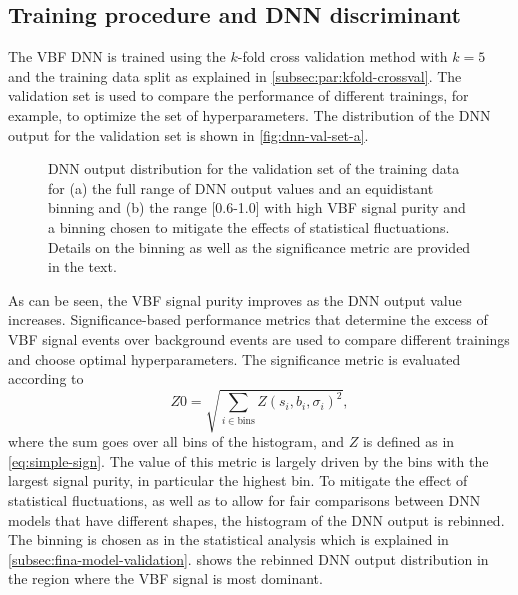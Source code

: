 \subsection{Training procedure and DNN discriminant}
\label{subsec:performance-metrics}
The VBF DNN is trained using the $k$-fold cross validation method with $k=5$ and the training data split as explained in \cref{subsec:par:kfold-crossval}.
The validation set is used to compare the performance of different trainings, for example, to optimize the set of hyperparameters.
The distribution of the DNN output for the validation set is shown in \cref{fig:dnn-val-set-a}.
\begin{figure}[ht]
    \caption{DNN output distribution for the validation set of the training data for (a) the full range of DNN output values and an equidistant binning and (b) the range [0.6-1.0] with high VBF signal purity and a binning chosen to mitigate the effects of statistical fluctuations. Details on the binning as well as the significance metric are provided in the text.}
    \label{fig:dnn-val-set}
\end{figure}
As can be seen, the VBF signal purity improves as the DNN output value increases.
Significance-based performance metrics that determine the excess of VBF signal events over background events are used to compare different trainings and choose optimal hyperparameters.
The significance metric is evaluated according to
\begin{equation}
    \label{eq:significance-performance-metric}
    Z0 = \sqrt{ \sum_{i \in \text{bins}} Z(s_{i}, b_{i}, \sigma_{i})^2 },
\end{equation}
where the sum goes over all bins of the histogram, and $Z$ is defined as in \cref{eq:simple-sign}.
The value of this metric is largely driven by the bins with the largest signal purity, in particular the highest bin.
To mitigate the effect of statistical fluctuations, as well as to allow for fair comparisons between DNN models that have different shapes, the histogram of the DNN output is rebinned. The binning is chosen as in the statistical analysis which is explained in \cref{subsec:fina-model-validation}.  shows the rebinned DNN output distribution in the region where the VBF signal is most dominant. 
